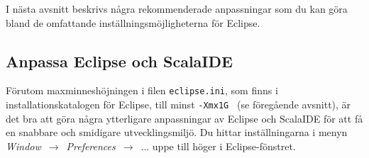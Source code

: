 \noindent I nästa avsnitt beskrivs några rekommenderade anpassningar som du kan göra bland de omfattande inställningsmöjligheterna för Eclipse.

\newpage

\subsection{Anpassa Eclipse och ScalaIDE}\label{subsection:appendix:ide:eclipse:tweaks}

\newcommand\Menu[1]{\textit{#1}}
\newcommand\MenuArrow[1]{\Menu{#1}~$\rightarrow$~}
\newcommand\FramedCheckmark[1]{~\frame{\checkmark}~~\textbf{#1}}
\newcommand\FramedUnchecked[1]{$\Box$~\textbf{#1}}
\newcommand\Button[1]{\fbox{\textbf{#1}}}
\newcommand\EclipsePrefs{\MenuArrow{Window}\MenuArrow{Preferences}}
\newcommand\EclipsePrefsGeneral{\EclipsePrefs\MenuArrow{General}}


Förutom maxminneshöjningen i filen \texttt{eclipse.ini}, som finns i installationskatalogen för Eclipse, till minst \texttt{-Xmx1G } (se föregående avsnitt), är det bra att göra några ytterligare anpassningar av Eclipse och ScalaIDE för att få en snabbare och smidigare utvecklingsmiljö. Du hittar inställningarna i menyn \EclipsePrefs ... uppe till höger i Eclipse-fönstret.



